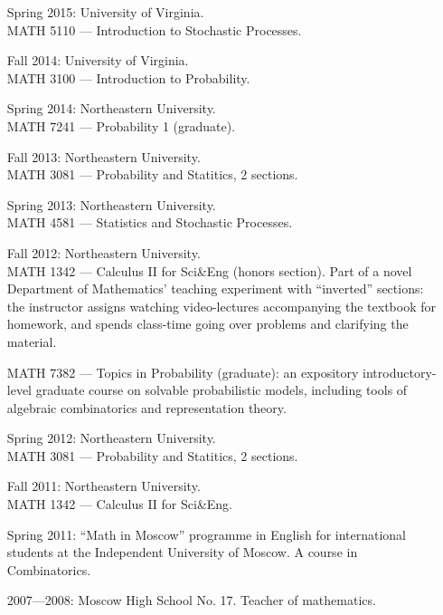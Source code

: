 \documentclass[letterpaper,11pt]{article}
\begin{document}
\begin{itemize}
	\item[Spring 2015:]   
	University of Virginia. \\
	MATH 5110 --- Introduction to Stochastic Processes.

	\item[Fall 2014:]   
	University of Virginia. \\
	MATH 3100 --- Introduction to Probability.

  \item[Spring 2014:]   
  Northeastern University. \\
  MATH 7241 --- 
  Probability 1 (graduate).

  \item[Fall 2013:]   
  Northeastern University. \\
  MATH 3081 --- 
  Probability and Statitics, 2 sections.
  \item[Spring 2013:] 
  Northeastern University. 
  \\
  MATH 4581 --- Statistics and Stochastic Processes.
  \item[Fall 2012:]
  Northeastern University. 
  \\
  MATH 1342 --- 
  Calculus II for Sci\&Eng (honors section). Part of a novel Department of Mathematics' teaching experiment with ``inverted'' sections: the instructor assigns watching video-lectures accompanying the textbook for homework, and spends class-time going over problems and clarifying the material.

  MATH 7382 --- Topics in Probability (graduate): an expository introductory-level graduate course on solvable probabilistic models, including tools of algebraic combinatorics and representation theory.

  \item[Spring 2012:] 
  Northeastern University. \\
  MATH 3081 --- 
  Probability and Statitics, 2 sections.
  \item[Fall 2011:]
  Northeastern University.\\
  MATH 1342 --- 
  Calculus II for Sci\&Eng.
  \item[Spring 2011:]
  ``Math in Moscow'' programme in English for international students at the Independent University of Moscow. A course in Combinatorics.

  \item[2007---2008:]
  Moscow High School No. 17.
  Teacher of mathematics.
\end{itemize}
\end{document}
